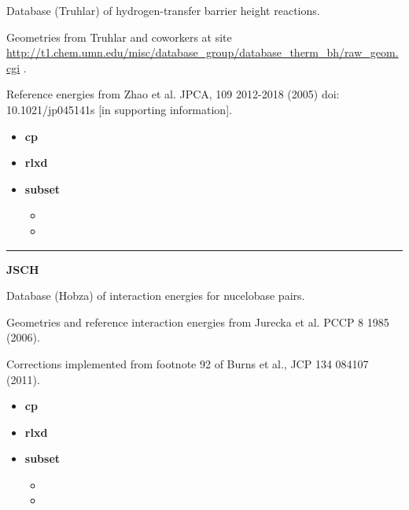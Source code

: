 \documentclass[letterpaper,10pt,english]{sphinxmanual}
\begin{document}
\begin{DUlineblock}{0em}
\item[] Database (Truhlar) of hydrogen-transfer barrier height reactions.
\item[] Geometries from Truhlar and coworkers at site \href{http://t1.chem.umn.edu/misc/database\_group/database\_therm\_bh/raw\_geom.cgi}{http://t1.chem.umn.edu/misc/database\_group/database\_therm\_bh/raw\_geom.cgi} .
\item[] Reference energies from Zhao et al. JPCA, 109 2012-2018 (2005) doi: 10.1021/jp045141s {[}in supporting information{]}.
\end{DUlineblock}
\begin{itemize}
\item {} 
\textbf{cp}  

\item {} 
\textbf{rlxd} 

\item {} 
\textbf{subset}
\begin{itemize}
\item {} 

\item {} 

\end{itemize}

\end{itemize}


\bigskip\hrule{}\bigskip

\label{db:module-JSCH}
\textbf{JSCH}

\begin{DUlineblock}{0em}
\item[] Database (Hobza) of interaction energies for nucelobase pairs.
\item[] Geometries and reference interaction energies from Jurecka et al. PCCP 8 1985 (2006).
\item[] Corrections implemented from footnote 92 of Burns et al., JCP 134 084107 (2011).
\end{DUlineblock}
\begin{itemize}
\item {} 
\textbf{cp}   \textbar{}\textbar{} 

\item {} 
\textbf{rlxd} 

\item {} 
\textbf{subset}
\begin{itemize}
\item {} 

\item {} 

\end{itemize}

\end{itemize}
\end{document}
